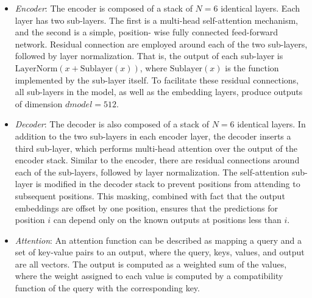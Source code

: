 \begin{itemize}
	\item \textit{Encoder}: The encoder is composed of a stack of $N = 6$
	      identical layers. Each layer has two
	      sub-layers. The first is a multi-head self-attention mechanism\cite{attention}, and the second is a simple, position-
	      wise fully connected feed-forward network. Residual connection
	      are employed around each of
	      the two sub-layers, followed by layer normalization. That is, the output of each sub-layer is
	      $\text{LayerNorm}(x + \text{Sublayer}(x))$, where $\text{Sublayer}(x)$ is the function implemented by the sub-layer
	      itself. To facilitate these residual connections, all sub-layers in the model, as well as the embedding
	      layers, produce outputs of dimension $dmodel = 512$.

	\item \textit{Decoder}: The decoder is also composed of a stack of $N = 6$
	      identical layers. In addition to the two
	      sub-layers in each encoder layer, the decoder inserts a third sub-layer, which performs multi-head
	      attention over the output of the encoder stack. Similar to the encoder, there are residual connections
	      around each of the sub-layers, followed by layer normalization. The self-attention sub-layer is modified in the decoder stack to prevent positions from attending to subsequent positions. This
	      masking\cite{attention}, combined with fact that the output embeddings are offset by one position, ensures that the
	      predictions for position $i$ can depend only on the known outputs at positions less than $i$.

	\item \textit{Attention}: An attention\cite{attention} function can be described as
	      mapping a query and a set of key-value pairs to an output,
	      where the query, keys, values, and output are all vectors\cite{trans1}. The output is computed as a weighted sum of the values, where the weight assigned to each value is computed by a compatibility function of the
	      query with the corresponding key\cite{attention}.
\end{itemize}


